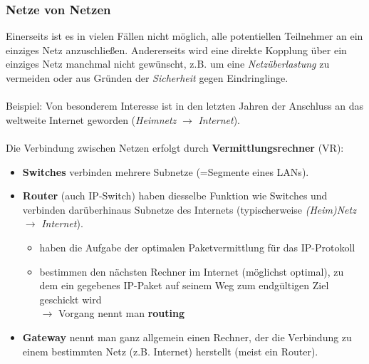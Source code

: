 \subsubsection{Netze von Netzen}
Einerseits ist es in vielen Fällen nicht möglich, alle potentiellen Teilnehmer an ein einziges Netz
anzuschließen. Andererseits wird eine direkte Kopplung über ein einziges Netz manchmal nicht gewünscht,
z.B. um eine \textit{Netzüberlastung} zu vermeiden oder aus Gründen der \textit{Sicherheit} gegen Eindringlinge.\\~\\
Beispiel: Von besonderem Interesse ist in den letzten Jahren der Anschluss an das weltweite Internet geworden (\textit{Heimnetz} $\to$ \textit{Internet}).\\~\\
Die Verbindung zwischen Netzen erfolgt durch \textbf{Vermittlungsrechner} (VR):
\begin{itemize}
	\item \textbf{Switches} verbinden mehrere Subnetze (=Segmente eines LANs). 
	\item \textbf{Router} (auch IP-Switch) haben diesselbe Funktion wie Switches und verbinden darüberhinaus Subnetze des Internets (typischerweise \textit{(Heim)Netz} $\to$ \textit{Internet}).
	\begin{itemize}
		\item haben die Aufgabe der optimalen Paketvermittlung für das IP-Protokoll
		\item bestimmen den nächsten Rechner im Internet (möglichst optimal), zu dem ein gegebenes IP-Paket auf seinem Weg zum endgültigen Ziel geschickt wird\\
		$\to$ Vorgang nennt man \textbf{routing}
	\end{itemize}
	\item \textbf{Gateway} nennt man ganz allgemein einen Rechner, der die Verbindung zu einem bestimmten Netz (z.B. Internet) herstellt (meist ein Router).
\end{itemize}
%
%
%
